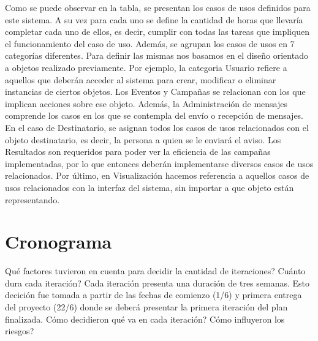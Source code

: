 \documentclass[a4paper, 11pt]{article}
\begin{document}
Como se puede observar en la tabla, se presentan los casos de usos definidos para este sistema. A su vez para cada uno se define la cantidad de horas que llevaría completar cada uno de ellos, es decir, cumplir con todas las tareas que impliquen el funcionamiento del caso de uso. Además, se agrupan los casos de usos en 7 categorías diferentes. Para definir las mismas nos basamos en el diseño orientado a objetos realizado previamente. Por ejemplo, la categoria Usuario refiere a aquellos que deberán acceder al sistema para crear, modificar o eliminar instancias de ciertos objetos. Los Eventos y Campañas se relacionan con los que implican acciones sobre ese objeto. Además, la Administración de mensajes comprende los casos en los que se contempla del envío o recepción de mensajes. 
En el caso de Destinatario, se asignan todos los casos de usos relacionados con el objeto destinatario, es decir, la persona a quien se le enviará el aviso. Los Resultados son requeridos para poder ver la eficiencia de las campañas implementadas, por lo que entonces deberán implementarse diversos casos de usos relacionados. 
Por último, en Visualización hacemos referencia a aquellos casos de usos relacionados con la interfaz del sistema, sin importar a que objeto están representando. 


\newpage

\section{Cronograma}
Qué factores tuvieron en cuenta para decidir la cantidad de iteraciones?
Cuánto dura cada iteración?
Cada iteración presenta una duración de tres semanas. Esto decición fue tomada a partir de las fechas de comienzo (1/6) y primera entrega del proyecto (22/6) donde se deberá presentar la primera iteración del plan finalizada. 
Cómo decidieron qué va en cada iteración?
Cómo influyeron los riesgos?
\end{document}
